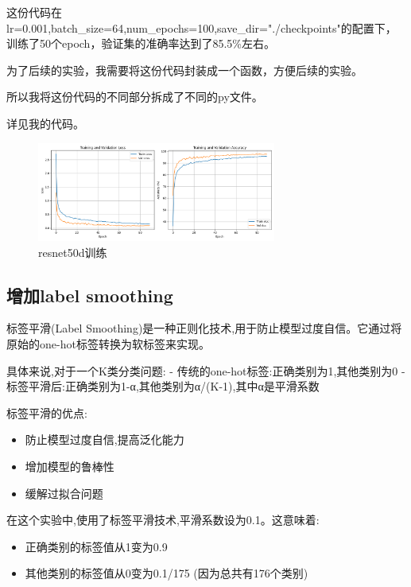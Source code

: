 \documentclass[12pt,a4paper,UTF8]{article}
\begin{document}
这份代码在lr=0.001,batch\_size=64,num\_epochs=100,save\_dir="./checkpoints"的配置下，训练了50个epoch，验证集的准确率达到了85.5\%左右。

为了后续的实验，我需要将这份代码封装成一个函数，方便后续的实验。

所以我将这份代码的不同部分拆成了不同的py文件。

详见我的代码。

\begin{figure}[htbp] \centering \includegraphics[width=0.7\textwidth]{figures/2024-12-12-19-27-42.png} \caption{resnet50d训练} \end{figure}



\subsection{增加label smoothing}
标签平滑(Label Smoothing)是一种正则化技术,用于防止模型过度自信。它通过将原始的one-hot标签转换为软标签来实现。

具体来说,对于一个K类分类问题:
- 传统的one-hot标签:正确类别为1,其他类别为0
- 标签平滑后:正确类别为1-α,其他类别为α/(K-1),其中α是平滑系数

标签平滑的优点:
\begin{itemize}
    \item 防止模型过度自信,提高泛化能力
    \item 增加模型的鲁棒性
    \item 缓解过拟合问题
\end{itemize}

在这个实验中,使用了标签平滑技术,平滑系数设为0.1。这意味着:
\begin{itemize}
    \item 正确类别的标签值从1变为0.9
    \item 其他类别的标签值从0变为0.1/175 (因为总共有176个类别)
\end{itemize}
\end{document}
